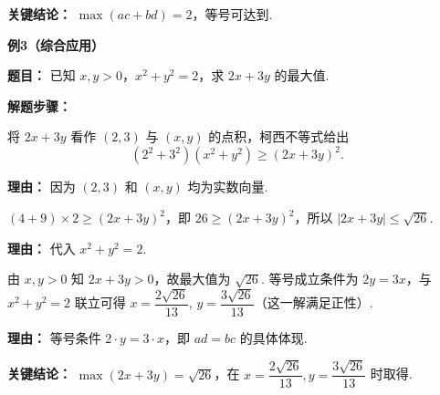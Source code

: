 \begin{examplebox}
	\textbf{\textcolor{CExample}{关键结论：}}
	$\max(ac+bd)=2$，等号可达到.

	\medskip
	\textbf{\textcolor{CExample}{例3（综合应用）}}

	\textbf{\textcolor{CExample}{题目：}}
	已知 $x,y>0$，$x^{2}+y^{2}=2$，求 $2x+3y$ 的最大值.

	\textbf{\textcolor{CExample}{解题步骤：}}
	\begin{description}[style=nextline, leftmargin=2.8em, labelsep=0.5em, itemsep=0.45em]
		\item[\textbf{第一步（构造柯西形式）：}] 将 $2x+3y$ 看作 $(2,3)$ 与 $(x,y)$ 的点积，柯西不等式给出
			\[
				(2^{2}+3^{2})(x^{2}+y^{2})\ge(2x+3y)^{2}.
			\]
			\par\textbf{理由：}
			因为 $(2,3)$ 和 $(x,y)$ 均为实数向量.
		\item[\textbf{第二步（代入已知条件）：}] $(4+9)\times2\ge(2x+3y)^{2}$，即 $26\ge(2x+3y)^{2}$，所以 $|2x+3y|\le\sqrt{26}$.
			\par\textbf{理由：}
			代入 $x^{2}+y^{2}=2$.
		\item[\textbf{第三步（确定最大值并检查符号）：}] 由 $x,y>0$ 知 $2x+3y>0$，故最大值为 $\sqrt{26}$. 等号成立条件为 $2y=3x$，与 $x^{2}+y^{2}=2$ 联立可得 $x=\dfrac{2\sqrt{26}}{13}$, $y=\dfrac{3\sqrt{26}}{13}$（这一解满足正性）.
			\par\textbf{理由：}
			等号条件 $2\cdot y=3\cdot x$，即 $ad=bc$ 的具体体现.
	\end{description}

	\textbf{\textcolor{CExample}{关键结论：}}
	$\max(2x+3y)=\sqrt{26}$，在 $x=\dfrac{2\sqrt{26}}{13},y=\dfrac{3\sqrt{26}}{13}$ 时取得.
\end{examplebox}
